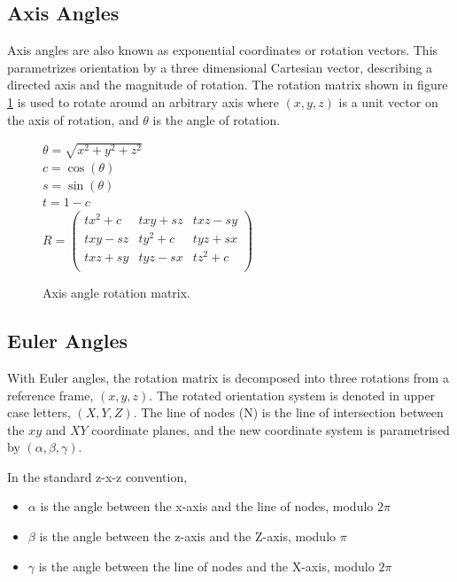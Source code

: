 \documentclass[12pt,a4,notitlepage]{report}
\renewcommand{\_}{\texttt{\symbol{95}}}
\newcommand{\<}{\texttt{\symbol{60}}}
\renewcommand{\>}{\texttt{\symbol{62}}}
\begin{document}
\subsection{Axis Angles}

Axis angles are also known as exponential coordinates or rotation vectors. This parametrizes orientation by a three dimensional Cartesian vector, describing a directed axis and the magnitude of rotation. The rotation matrix shown in figure \ref{axisangle} is used to rotate around an arbitrary axis where $(x,y,z)$ is a unit vector on the axis of rotation, and $\theta$ is the angle of rotation.\cite{GraphicsGems}

\begin{figure}
$\theta = \sqrt{x^2 + y^2 + z^2}$\\

$c = \cos(\theta)$\\
$s = \sin(\theta)$\\
$t = 1-c $\\

$R =
\left( \begin{array}{ccc}
      tx^2+c & txy+sz & txz-sy\\
		txy-sz & ty^2+c & tyz+sx\\
		txz+sy & tyz-sx & tz^2+c\\
\end{array} \right)$
\caption{Axis angle rotation matrix.}
\label{axisangle}
\end{figure}

\subsection{Euler Angles}

With Euler angles, the rotation matrix is decomposed into three rotations from a reference frame, $(x,y,z)$. The rotated orientation system is denoted in upper case letters, $(X,Y,Z)$. The line of nodes (N) is the line of intersection between the $xy$ and $XY$ coordinate planes, and the new coordinate system is parametrised by $(\alpha,\beta,\gamma)$.

In the standard z-x-z convention,

\begin{itemize}
\item $\alpha$ is the angle between the x-axis and the line of nodes, modulo $2\pi$
\item $\beta$ is the angle between the z-axis and the Z-axis, modulo $\pi$
\item $\gamma$ is the angle between the line of nodes and the X-axis, modulo $2\pi$
\end{itemize}
\end{document}
